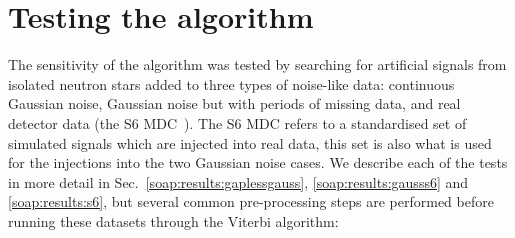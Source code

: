 \section{\label{soap:results} Testing the algorithm}
%
%
The sensitivity of the algorithm was tested by searching for artificial
signals from isolated neutron stars added to three types of noise-like data:
continuous Gaussian noise, Gaussian noise but with periods of missing data,
and real detector data (the S6 \gls{MDC}~\citep{walsh2016ComparisonMethods}). The S6 \gls{MDC} refers to a standardised set of simulated signals which are injected into real data, this set is also what is used for the injections into the two Gaussian noise cases. We describe each
of the tests in more detail in Sec.~\ref{soap:results:gaplessgauss}, \ref{soap:results:gausss6} and
\ref{soap:results:s6}, but several common pre-processing steps are performed
before running these datasets through the Viterbi algorithm:
%
%
